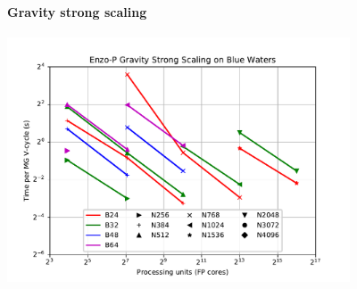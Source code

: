 \begin{frame}[fragile,label=ss-recent-gravity] 
\secframetitle{\ssRecentGravity}
\framesubtitle{Gravity strong scaling}
  \begin{center}
    \vspace{-0.1in}
    \begin{minipage}{4.5in}
      \begin{center}
        \begin{minipage}{4.0in}
          \includegraphics[width=4.0in]{scale-multigrid-strong.pdf}
        \end{minipage} \\
      \end{center}
    \end{minipage}
  \end{center}
\end{frame}

